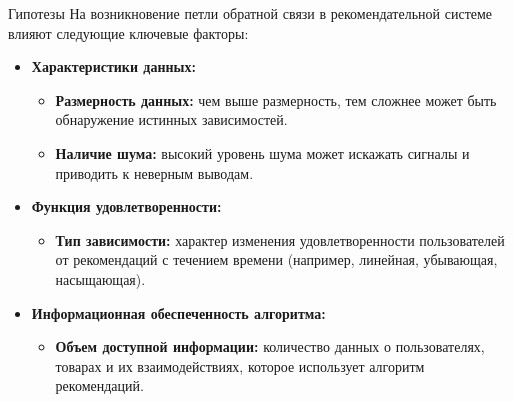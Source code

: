 \documentclass{beamer}
\begin{document}
    
        


\begin{frame}{Гипотезы}
  На возникновение петли обратной связи в рекомендательной системе влияют следующие ключевые факторы:
  \begin{itemize}
    \item \textbf{Характеристики данных:}
      \begin{itemize}
        \item \textbf{Размерность данных:} чем выше размерность, тем сложнее может быть обнаружение истинных зависимостей.
        \item \textbf{Наличие шума:} высокий уровень шума может искажать сигналы и приводить к неверным выводам.
      \end{itemize}
    \item \textbf{Функция удовлетворенности:}
      \begin{itemize}
        \item \textbf{Тип зависимости:} характер изменения удовлетворенности пользователей от рекомендаций с течением времени (например, линейная, убывающая, насыщающая).
      \end{itemize}
    \item \textbf{Информационная обеспеченность алгоритма:}
      \begin{itemize}
        \item \textbf{Объем доступной информации:} количество данных о пользователях, товарах и их взаимодействиях, которое использует алгоритм рекомендаций.
      \end{itemize}
  \end{itemize}
\end{frame}
\end{document}
